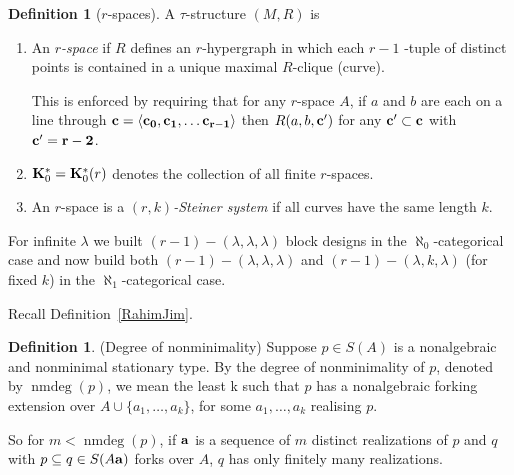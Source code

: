 \documentclass[11pt]{amsart}
\def\BB{\mathcal{B}}
\def\bK{{\bf K}}
\def\bL{{\bf L}}
\def\abar{{\bf a}}
\def\cbar{\bf c}
\def\nmdeg{\mathop{\rm nmdeg}}
\def\nmdeg{\operatorname{nmdeg}}
\theoremstyle{definition}
\newtheorem{definition}[theorem]{Definition}
\theoremstyle{remark}
\numberwithin{equation}{section}
\begin{document}
\begin{definition}[$r$-spaces]\label{defls}
A $\tau$-structure $(M,R)$ is

\begin{enumerate}
\item An {\em $r$-space} if $R$ defines an $r$-hypergraph in which each
    $r-1$ -tuple of distinct points is contained in a unique maximal
    $R$-clique (curve).  


   This is enforced by requiring that for any $r$-space $A$, if $a$ and $b$
    are each on a line through  $\cbar =\langle c_0,c_1, \ldots
    c_{r-1}\rangle$ then $R(a,b,\cbar')$ for any $\cbar' \subset \cbar$
    with $\cbar' = r-2$.


\item $\bK^*_0 = \bK^*_0(r)$ denotes the collection of all finite
    $r$-spaces.

\item An $r$-space is a {\em $(r,k)$-Steiner system} if all curves have the
    same length $k$.

        \end{enumerate}
\end{definition}

For infinite $\lambda$ we built $(r-1)-(\lambda, \lambda,\lambda)$ block
designs in the $\aleph_0$-categorical case and now build  both $(r-1)-(\lambda,
\lambda,\lambda)$ and $(r-1)-(\lambda, k,\lambda)$ (for fixed $k$) in the
$\aleph_1$-categorical case.

Recall Definition~\ref{RahimJim}.

\begin{definition} (Degree of nonminimality)  \label{nmdegdef} Suppose $p \in S(A)$ is a
nonalgebraic and nonminimal stationary type. By the degree of nonminimality
of $p$, denoted by $\nmdeg(p)$, we mean the least k such that $p$ has a
nonalgebraic forking extension over $A \cup \{a_1, \ldots , a_k\}$, for some
$a_1, \ldots , a_k$ realising $p$.

So for $m < \nmdeg(p)$, if
$\abar$ is a  sequence of $m$ distinct  realizations of
$p$ and $q$ with $p \subseteq q\in S(A\abar)$ forks over $A$, $q$ has only
finitely many realizations.
\end{definition}
\end{document}
